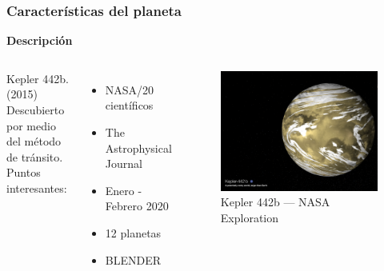 \documentclass[UKenglish]{beamer}
\begin{document}
\begin{frame}
\frametitle{Características del planeta}{\textbf{Descripción}}

\begin{columns}

Kepler 442b. (2015) Descubierto por medio del método de tránsito. \\
Puntos interesantes:
\begin{itemize}
\item NASA/20 científicos
\item The Astrophysical Journal
\item Enero - Febrero 2020 
\item 12 planetas
\item BLENDER
\end{itemize}


  \begin{figure}[h!]
    \centering
    \includegraphics[scale=0.12]{Imagenes/Plat}
    \caption{Kepler 442b — NASA Exploration}
    \label{fig:punto2s}
    \end{figure}
\end{columns}
\end{frame}
\end{document}
